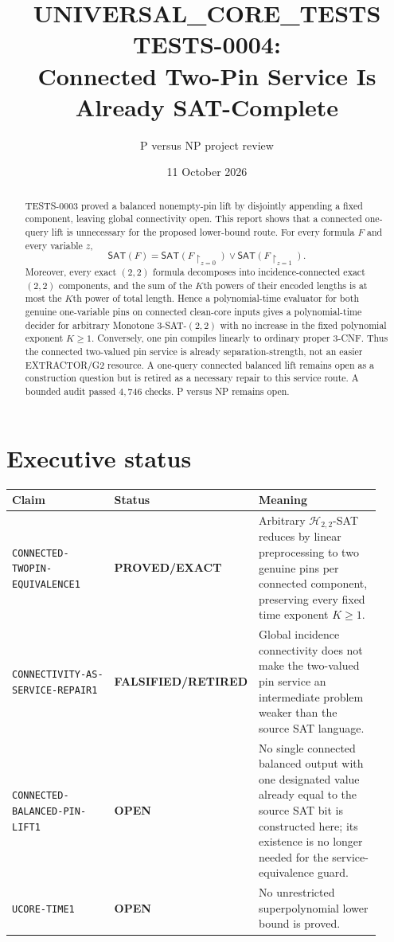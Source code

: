 \documentclass[11pt]{article}
\title{UNIVERSAL\_CORE\_TESTS TESTS-0004:\\
Connected Two-Pin Service Is Already SAT-Complete}
\author{P versus NP project review}
\date{11 October 2026}
\newcommand{\SAT}{\mathsf{SAT}}
\newcommand{\Htwo}{\mathcal H_{2,2}}
\newcommand{\EXACT}{\textbf{PROVED/EXACT}}
\newcommand{\OPEN}{\textbf{OPEN}}
\newcommand{\RETIRED}{\textbf{FALSIFIED/RETIRED}}
\begin{document}
\maketitle

\begin{abstract}
TESTS-0003 proved a balanced nonempty-pin lift by disjointly appending a
fixed component, leaving global connectivity open.  This report shows that a
connected one-query lift is unnecessary for the proposed lower-bound route.
For every formula $F$ and every variable $z$,
\[
 \SAT(F)=\SAT(F\upharpoonright_{z=0})\vee
          \SAT(F\upharpoonright_{z=1}).
\]
Moreover, every exact $(2,2)$ formula decomposes into incidence-connected
exact $(2,2)$ components, and the sum of the $K$th powers of their encoded
lengths is at most the $K$th power of total length.  Hence a polynomial-time
evaluator for both genuine one-variable pins on connected clean-core inputs
gives a polynomial-time decider for arbitrary Monotone $3$-SAT-$(2,2)$ with
no increase in the fixed polynomial exponent $K\ge1$.  Conversely, one pin
compiles linearly to ordinary proper 3-CNF.  Thus the connected two-valued
pin service is already separation-strength, not an easier EXTRACTOR/G2
resource.  A one-query connected balanced lift remains open as a construction
question but is retired as a necessary repair to this service route.  A
bounded audit passed $4{,}746$ checks.  P versus NP remains open.
\end{abstract}

\section{Executive status}

\begin{center}
\small
\begin{tabular}{p{0.31\linewidth}p{0.22\linewidth}p{0.39\linewidth}}
\toprule
Claim & Status & Meaning\\
\midrule
\texttt{CONNECTED-TWOPIN-EQUIVALENCE1} & \EXACT &
Arbitrary $\Htwo$-SAT reduces by linear preprocessing to two genuine pins
per connected component, preserving every fixed time exponent $K\ge1$.\\
\texttt{CONNECTIVITY-AS-SERVICE-REPAIR1} & \RETIRED &
Global incidence connectivity does not make the two-valued pin service an
intermediate problem weaker than the source SAT language.\\
\texttt{CONNECTED-BALANCED-PIN-LIFT1} & \OPEN &
No single connected balanced output with one designated value already equal
to the source SAT bit is constructed here; its existence is no longer needed
for the service-equivalence guard.\\
\texttt{UCORE-TIME1} & \OPEN &
No unrestricted superpolynomial lower bound is proved.\\
\bottomrule
\end{tabular}
\end{center}
\end{document}
